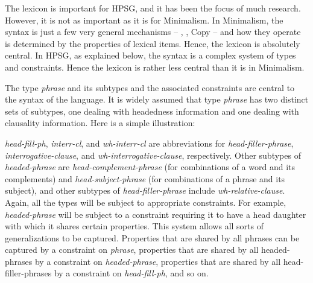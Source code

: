 \documentclass[output=paper]{langsci/langscibook}
\begin{document}
The lexicon is important for \gls{HPSG}, and it has been the focus of much
research. However, it is not as important as it is for Minimalism. In
Minimalism, the syntax is just a few very general mechanisms -- , ,
Copy -- and how they operate is determined by the properties of lexical items.
Hence, the lexicon is absolutely central. In \gls{HPSG}, as explained below,
the syntax is a complex system of types and constraints. Hence the lexicon is
rather less central than it is in Minimalism.

The type \emph{phrase} and its subtypes and the associated constraints are
central to the syntax of the language. It is widely assumed that type
\emph{phrase} has two distinct sets of subtypes, one dealing with headedness
information and one dealing with clausality information. Here is a simple
illustration:

\ea\label{ex:borsley:4.5}
\z
%
\emph{head-fill-ph}, \emph{interr-cl}, and \emph{wh-interr-cl} are
abbreviations for \emph{head-filler-phrase}, \emph{interrogative-clause}, and
\emph{wh-interrogative-clause}, respectively. Other subtypes of
\emph{headed-phrase}  are \emph{head-complement-phrase} (for combinations of a
word and its complements) and \emph{head-subject-phrase} (for combinations of a
phrase and its subject), and other subtypes of \emph{head-filler-phrase}
include \emph{wh-relative-clause}. Again, all the types will be subject to
appropriate constraints. For example, \emph{headed-phrase} will be subject to a
constraint requiring it to have a head daughter with which it shares certain
properties. This system allows all sorts of generalizations to be captured.
Properties that are shared by all phrases can be captured by a constraint on
\emph{phrase}, properties that are shared by all headed-phrases by a constraint
on \emph{headed-phrase}, properties that are shared by all head-filler-phrases
by a constraint on \emph{head-fill-ph}, and so on.
\end{document}
